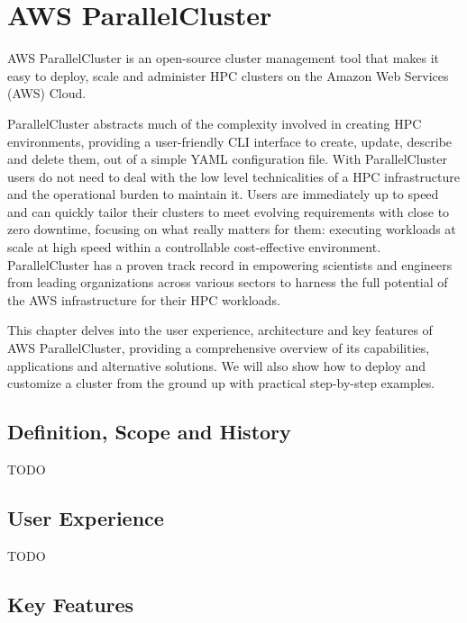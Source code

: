 

\chapter{AWS ParallelCluster}

AWS ParallelCluster is an open-source cluster management tool that makes it easy to deploy, scale and administer HPC clusters on the Amazon Web Services (AWS) Cloud. 

ParallelCluster abstracts much of the complexity involved in creating HPC environments, providing a user-friendly CLI interface to create, update, describe and delete them, out of a simple YAML configuration file. 
With ParallelCluster users do not need to deal with the low level technicalities of a HPC infrastructure and the operational burden to maintain it. 
Users are immediately up to speed and can quickly tailor their clusters to meet evolving requirements with close to zero downtime, focusing on what really matters for them: executing workloads at scale at high speed within a controllable cost-effective environment.
ParallelCluster has a proven track record in empowering scientists and engineers from leading organizations across various sectors to harness the full potential of the AWS infrastructure for their HPC workloads.

This chapter delves into the user experience, architecture and key features of AWS ParallelCluster, providing a comprehensive overview of its capabilities, applications and alternative solutions. 
We will also show how to deploy and customize a cluster from the ground up with practical step-by-step examples.

\section{Definition, Scope and History}

TODO

\section{User Experience}

TODO

\section{Key Features}

